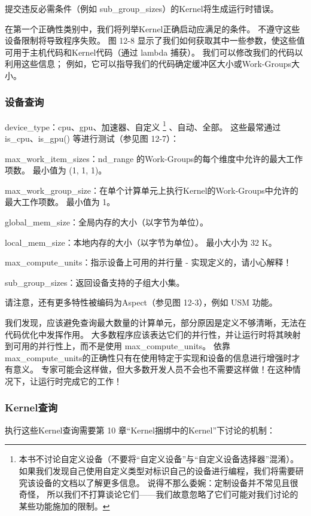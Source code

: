 \begin{remark}
	提交违反必需条件（例如 sub\_group\_sizes）的Kernel将生成运行时错误。
\end{remark}

在第一个正确性类别中，我们将列举Kernel正确启动应满足的条件。 不遵守这些设备限制将导致程序失败。 
图 12-8 显示了我们如何获取其中一些参数，使这些值可用于主机代码和Kernel代码（通过 lambda 捕获）。 
我们可以修改我们的代码以利用这些信息； 例如，它可以指导我们的代码确定缓冲区大小或Work-Groups大小。

\subsubsection{设备查询}
device\_type：cpu、gpu、加速器、自定义
\footnote{本书不讨论自定义设备（不要将“自定义设备”与“自定义设备选择器”混淆）。
如果我们发现自己使用自定义类型对标识自己的设备进行编程，我们将需要研究该设备的文档以了解更多信息。
说得不那么委婉：定制设备并不常见且很奇怪，
所以我们不打算谈论它们——我们故意忽略了它们可能对我们讨论的某些功能施加的限制。}
、自动、全部。 
这些最常通过 is\_cpu、is\_gpu() 等进行测试（参见图 12-7）：

max\_work\_item\_sizes：nd\_range 的Work-Groups的每个维度中允许的最大工作项数。 最小值为 (1, 1, 1)。

max\_work\_group\_size：在单个计算单元上执行Kernel的Work-Groups中允许的最大工作项数。 最小值为 1。

global\_mem\_size：全局内存的大小（以字节为单位）。

local\_mem\_size：本地内存的大小（以字节为单位）。 最小大小为 32 K。

max\_compute\_units：指示设备上可用的并行量 - 实现定义的，请小心解释！

sub\_group\_sizes：返回设备支持的子组大小集。

请注意，还有更多特性被编码为Aspect（参见图 12-3），例如 USM 功能。

\begin{remark}
我们发现，应该避免查询最大数量的计算单元，部分原因是定义不够清晰，无法在代码优化中发挥作用。
大多数程序应该表达它们的并行性，并让运行时将其映射到可用的并行性上，而不是使用 max\_compute\_units。
依靠max\_compute\_units的正确性只有在使用特定于实现和设备的信息进行增强时才有意义。
专家可能会这样做，但大多数开发人员不会也不需要这样做！在这种情况下，让运行时完成它的工作！
\end{remark}

\subsubsection{Kernel查询}
执行这些Kernel查询需要第 10 章“Kernel捆绑中的Kernel”下讨论的机制：

